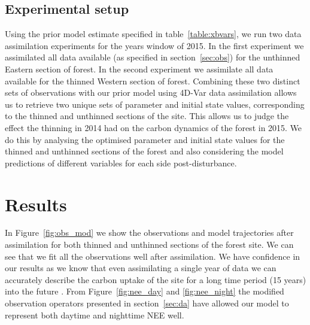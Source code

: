 \documentclass[12pt]{article}
\begin{document}

\subsection{Experimental setup}


Using the prior model estimate specified in table~\ref{table:xbvars}, we run two data assimilation experiments for the years window of 2015. In the first experiment we assimilated all data available (as specified in section~\ref{sec:obs}) for the unthinned Eastern section of forest. In the second experiment we assimilate all data available for the thinned Western section of forest. Combining these two distinct sets of observations with our prior model using 4D-Var data assimilation allows us to retrieve two unique sets of parameter and initial state values, corresponding to the thinned and unthinned sections of the site. This allows us to judge the effect the thinning in 2014 had on the carbon dynamics of the forest in 2015. We do this by analysing the optimised parameter and initial state values for the thinned and unthinned sections of the forest and also considering the model predictions of different variables for each side post-disturbance. 

\section{Results} \label{sec:results}
\FloatBarrier

In Figure~\ref{fig:obs_mod} we show the observations and model trajectories after assimilation for both thinned and unthinned sections of the forest site. We can see that we fit all the observations well after assimilation. We have confidence in our results as we know that even assimilating a single year of data we can accurately describe the carbon uptake of the site for a long time period (15 years) into the future \citep{Pinnington2016299}. From Figure~\ref{fig:nee_day} and \ref{fig:nee_night} the modified observation operators presented in section~\ref{sec:da} have allowed our model to represent both daytime and nighttime NEE well. 
\end{document}

